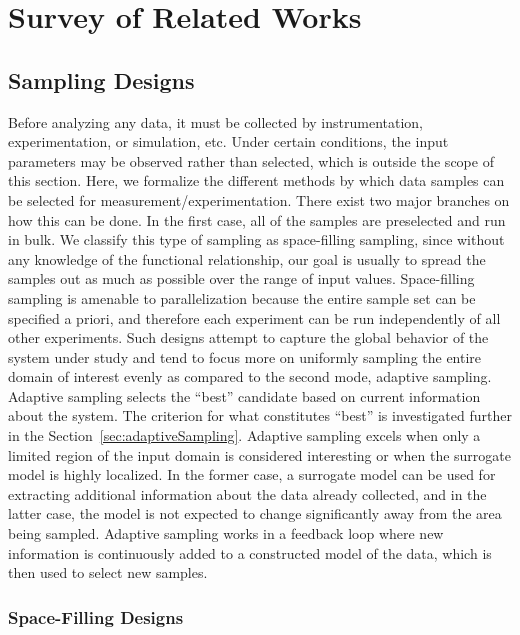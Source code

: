 
\chapter{Survey of Related Works}
\label{ch:related}
\vspace{-2em}
\section{Sampling Designs}
\label{sec:sampling}

Before analyzing any data, it must be collected by instrumentation, experimentation, or simulation, etc.
%
Under certain conditions, the input parameters may be observed rather than selected, which is outside the scope of this section.
%
Here, we formalize the different methods by which data samples can be selected for measurement/experimentation.
%
There exist two major branches on how this can be done.
%
In the first case, all of the samples are preselected and run in bulk.
%
We classify this type of sampling as space-filling sampling, since without any knowledge of the functional relationship, our goal is usually to spread the samples out as much as possible over the range of input values.
%
Space-filling sampling is amenable to parallelization because the entire sample set can be specified a priori, and therefore each experiment can be run independently of all other experiments.
%
Such designs attempt to capture the global behavior of the system under study and tend to focus more on uniformly sampling the entire domain of interest evenly as compared to the second mode, adaptive sampling.
%
Adaptive sampling selects the ``best'' candidate based on current information about the system.
%
The criterion for what constitutes ``best'' is investigated further in the Section~\ref{sec:adaptiveSampling}.
%
Adaptive sampling excels when only a limited region of the input domain is considered interesting or when the surrogate model is highly localized.
%
In the former case, a surrogate model can be used for extracting additional information about the data already collected, and in the latter case, the model is not expected to change significantly away from the area being sampled.
%
Adaptive sampling works in a feedback loop where new information is continuously added to a constructed model of the data, which is then used to select new samples.

\subsection{Space-Filling Designs}
\label{sec:forwardSampling}

